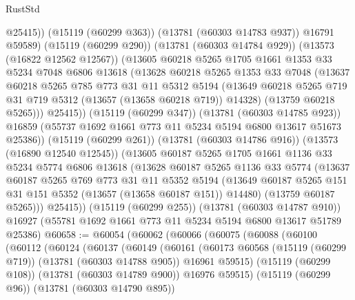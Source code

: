 \begin{lexlean}{RustStd}
\begin{coremodule}
                @25415))
            (@15119 (@60299 @363))
            (@13781 (@60303 @14783 @937))
            @16791
            @59589)
          (@15119 (@60299 @290))
          (@13781 (@60303 @14784 @929))
          (@13573 (@16822 @12562 @12567))
          (@13605
            @60218
            @5265
            @1705
            @1661
            @1353
            @33
            @5234
            @7048
            @6806
            @13618
            (@13628
              @60218
              @5265
              @1353
              @33
              @7048
              (@13637
                @60218
                @5265
                @785
                @773
                @31
                @11
                @5312
                @5194
                (@13649 @60218 @5265 @719 @31 @719 @5312 (@13657 (@13658 @60218 @719)) @14328)
                (@13759 @60218 @5265)))
            @25415))
        (@15119 (@60299 @347))
        (@13781 (@60303 @14785 @923))
        @16859
        (@55737 @1692 @1661 @773 @11 @5234 @5194 @6800 @13617 @51673 @25386))
      (@15119 (@60299 @261))
      (@13781 (@60303 @14786 @916))
      (@13573 (@16890 @12540 @12545))
      (@13605
        @60187
        @5265
        @1705
        @1661
        @1136
        @33
        @5234
        @5774
        @6806
        @13618
        (@13628
          @60187
          @5265
          @1136
          @33
          @5774
          (@13637
            @60187
            @5265
            @769
            @773
            @31
            @11
            @5352
            @5194
            (@13649 @60187 @5265 @151 @31 @151 @5352 (@13657 (@13658 @60187 @151)) @14480)
            (@13759 @60187 @5265)))
        @25415))
    (@15119 (@60299 @255))
    (@13781 (@60303 @14787 @910))
    @16927
    (@55781 @1692 @1661 @773 @11 @5234 @5194 @6800 @13617 @51789 @25386)
@60658 := @60054
    (@60062
      (@60066
        (@60075
          (@60088
            (@60100
              (@60112
                (@60124
                  (@60137
                    (@60149
                      (@60161
                        (@60173
                          @60568
                          (@15119 (@60299 @719))
                          (@13781 (@60303 @14788 @905))
                          @16961
                          @59515)
                        (@15119 (@60299 @108))
                        (@13781 (@60303 @14789 @900))
                        @16976
                        @59515)
                      (@15119 (@60299 @96))
                      (@13781 (@60303 @14790 @895))

\end{coremodule}
\end{lexlean}
